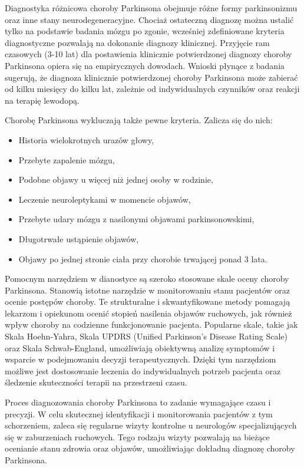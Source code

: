 Diagnostyka różnicowa choroby Parkinsona obejmuje różne formy parkinsonizmu oraz inne stany neurodegeneracyjne.
Chociaż ostateczną diagnozę można ustalić tylko na podstawie badania mózgu po zgonie, wcześniej zdefiniowane kryteria diagnostyczne pozwalają na dokonanie diagnozy klinicznej.
Przyjęcie ram czasowych (3-10 lat) dla postawienia klinicznie potwierdzonej diagnozy choroby Parkinsona opiera się na empirycznych dowodach.
Wnioski płynące z badania \cite{ROSSI202153} sugerują, że diagnoza klinicznie potwierdzonej choroby Parkinsona może zabierać od kilku miesięcy do kilku lat, zależnie od indywidualnych czynników oraz reakcji na terapię lewodopą.

Chorobę Parkinsona wykluczają także pewne kryteria. Zalicza się do nich:
\begin{itemize}[itemsep=0.5pt]
	\item Historia wielokrotnych urazów głowy,
	\item Przebyte zapalenie mózgu,
	\item Podobne objawy u więcej niż jednej osoby w rodzinie,
	\item Leczenie neuroleptykami w momencie objawów,
	\item Przebyte udary mózgu z nasilonymi objawami parkinsonowskimi,
	\item Długotrwałe ustąpienie objawów,
	\item Objawy po jednej stronie ciała przy chorobie trwającej ponad 3 lata.
\end{itemize}


Pomocnym narzędziem w dianostyce są szeroko stosowane skale oceny choroby Parkinsona.
Stanowią istotne narzędzie w monitorowaniu stanu pacjentów oraz ocenie postępów choroby.
Te strukturalne i skwantyfikowane metody pomagają lekarzom i opiekunom ocenić stopień nasilenia objawów ruchowych,
jak również wpływ choroby na codzienne funkcjonowanie pacjenta.
Popularne skale, takie jak Skala Hoehn-Yahra, Skala UPDRS (Unified Parkinson's Disease Rating Scale) oraz Skala Schwab-England,
umożliwiają obiektywną analizę symptomów i wsparcie w podejmowaniu decyzji terapeutycznych.
Dzięki tym narzędziom możliwe jest dostosowanie leczenia do indywidualnych potrzeb pacjenta oraz śledzenie skuteczności terapii na przestrzeni czasu.


Proces diagnozowania choroby Parkinsona to zadanie wymagające czasu i precyzji.
W celu skutecznej identyfikacji i monitorowania pacjentów z tym schorzeniem, zaleca się regularne wizyty kontrolne u neurologów specjalizujących się w zaburzeniach ruchowych. Tego rodzaju wizyty pozwalają na bieżące ocenianie stanu zdrowia oraz objawów, umożliwiając dokładną diagnozę choroby Parkinsona.

